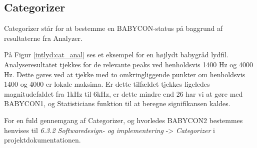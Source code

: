 \subsection{Categorizer}
Categorizer står for at bestemme en BABYCON-status på baggrund af resultaterne fra Analyzer. 

På Figur \ref{intlyd:cat_anal} ses et eksempel for en højlydt babygråd lydfil. Analyseresultatet tjekkes for de relevante peaks ved henholdsvis 1400 Hz og 4000 Hz. Dette gøres ved at tjekke med to omkringliggende punkter om henholdsvis 1400 og 4000 er lokale maksima. Er dette tilfældet tjekkes ligeledes magnitudefaldet fra 1kHz til 6kHz, er dette mindre end 26 har vi at gøre med BABYCON1, og Statisticians funktion til at beregne signifikansen kaldes.  


For en fuld gennemgang af Categorizer, og hvorledes BABYCON2 bestemmes henvises til \textit{6.3.2 Softwaredesign- og implementering} -> \textit{Categorizer} i projektdokumentationen. 